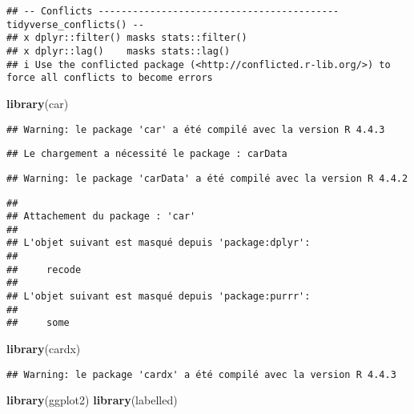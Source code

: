 \documentclass[
]{article}
\newenvironment{Shaded}{\begin{snugshade}}{\end{snugshade}}
\newcommand{\FunctionTok}[1]{\textcolor[rgb]{0.13,0.29,0.53}{\textbf{#1}}}
\newcommand{\NormalTok}[1]{#1}
\begin{document}
\begin{verbatim}
## -- Conflicts ------------------------------------------ tidyverse_conflicts() --
## x dplyr::filter() masks stats::filter()
## x dplyr::lag()    masks stats::lag()
## i Use the conflicted package (<http://conflicted.r-lib.org/>) to force all conflicts to become errors
\end{verbatim}

\begin{Shaded}
\begin{Highlighting}[]
\FunctionTok{library}\NormalTok{(car)}
\end{Highlighting}
\end{Shaded}

\begin{verbatim}
## Warning: le package 'car' a été compilé avec la version R 4.4.3
\end{verbatim}

\begin{verbatim}
## Le chargement a nécessité le package : carData
\end{verbatim}

\begin{verbatim}
## Warning: le package 'carData' a été compilé avec la version R 4.4.2
\end{verbatim}

\begin{verbatim}
## 
## Attachement du package : 'car'
## 
## L'objet suivant est masqué depuis 'package:dplyr':
## 
##     recode
## 
## L'objet suivant est masqué depuis 'package:purrr':
## 
##     some
\end{verbatim}

\begin{Shaded}
\begin{Highlighting}[]
\FunctionTok{library}\NormalTok{(cardx)}
\end{Highlighting}
\end{Shaded}

\begin{verbatim}
## Warning: le package 'cardx' a été compilé avec la version R 4.4.3
\end{verbatim}

\begin{Shaded}
\begin{Highlighting}[]
\FunctionTok{library}\NormalTok{(ggplot2)}
\FunctionTok{library}\NormalTok{(labelled)}
\end{Highlighting}
\end{Shaded}
\end{document}
